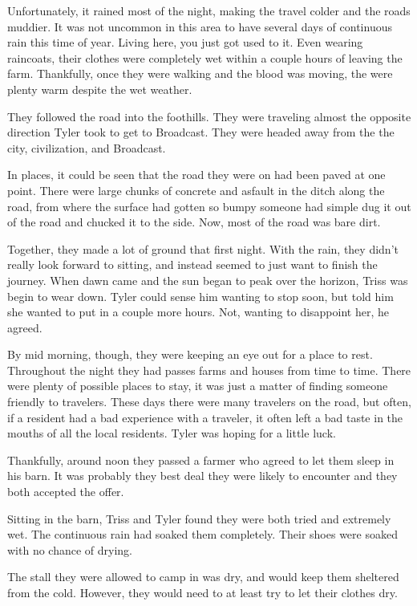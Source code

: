 \documentclass[courier]{sffms}
\begin{document}
Unfortunately, it rained most of the night,
making the travel colder and the roads
muddier. It was not uncommon in this area
to have several days of continuous rain this time
of year. Living here, you just got used to it.
Even wearing raincoats, their clothes were
completely wet within a couple hours of leaving
the farm. Thankfully, once they were walking
and the blood was moving, the were plenty
warm despite the wet weather.

They followed the road into the foothills. They
were traveling almost the opposite direction
Tyler took to get to Broadcast. They were headed
away from the the city, civilization, and Broadcast.

In places, it could be seen that the road they
were on had been paved at one point. There were
large chunks of concrete and asfault in the ditch
along the road, from where the surface had gotten
so bumpy someone had simple dug it out of the
road and chucked it to the side. Now, most of the
road was bare dirt.

Together, they made a lot of ground that first
night. With the rain, they didn't really look
forward to sitting, and instead seemed to just
want to finish the journey. When dawn came and
the sun began to peak over the horizon, Triss was
begin to wear down. Tyler could sense him wanting
to stop soon, but told him she wanted to put
in a couple more hours. Not, wanting to disappoint
her, he agreed.

By mid morning, though, they were keeping an
eye out for a place to rest. Throughout the night
they had passes farms and houses from time to
time. There were plenty of possible places to stay,
it was just a matter of finding someone friendly to
travelers. These days there were many travelers
on the road, but often, if a resident had a bad
experience with a traveler, it often left a bad taste
in the mouths of all the local residents. Tyler
was hoping for a little luck.

Thankfully, around noon they passed a farmer
who agreed to let them sleep in his barn. It was
probably they best deal they were likely to
encounter and they both accepted the offer.

Sitting in the barn, Triss and Tyler found they were both
tried and extremely wet. The continuous rain had soaked
them completely. Their shoes were soaked with no chance
of drying.

The stall they were allowed to camp in was dry, and would
keep them sheltered from the cold. However, they would
need to at least try to let their clothes dry.
\end{document}
